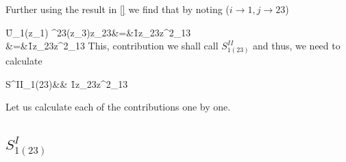 \documentclass[12pt,epsfig]{article}
\begin{document}
Further using the result in \eqref{} we find that by noting ($i\rightarrow 1, j\rightarrow 23$)

\be 
\f{U_1(z_1) ^{23}(z_3)}{z_{23}}&=&\f{1}{z_{23}z^2_{13}} \non\\
	&=&\f{1}{z_{23}z^2_{13}} \label{contri_2}
\ee
This, contribution we shall call $S^{II}_{1(23)}$ and thus, we need to calculate

\be 
S^{II}_{1(23)}&\equiv& \f{1}{z_{23}z^2_{13}} 
\ee

Let us calculate each of the contributions one by one.

\subsection{$S^I_{1(23)}$} 
\end{document}
